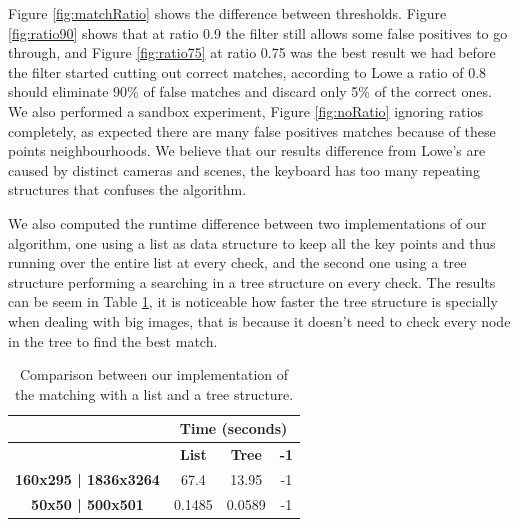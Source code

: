 \documentclass[12pt,a4paper]{article}
\begin{document}
	Figure \ref{fig:matchRatio} shows the difference between thresholds. Figure \ref{fig:ratio90} shows that at ratio 0.9 the filter still allows some false positives to go through, and Figure \ref{fig:ratio75} at ratio 0.75 was the best result we had before the filter started cutting out correct matches, according to Lowe a ratio of 0.8 should eliminate 90\% of false matches and discard only 5\% of the correct ones. We also performed a sandbox experiment, Figure \ref{fig:noRatio} ignoring ratios completely, as expected there are many false positives matches because of these points neighbourhoods. We believe that our results difference from Lowe's are caused by distinct cameras and scenes, the keyboard has too many repeating structures that confuses the algorithm.
\par
	We also computed the runtime difference between two implementations of our algorithm, one using a list as data structure to keep all the key points and thus running over the entire list at every check, and the second one using a tree structure performing a searching in a tree structure on every check. The results can be seem in Table \ref{table:match}, it is noticeable how faster the tree structure is specially when dealing with big images, that is because it doesn't need to check every node in the tree to find the best match.

\begin{table}[!h]
	\centering
	\begin{tabular}{|c|c|c|c|}
		\hline
		& \multicolumn{3}{c|}{\textbf{Time (seconds)}} \\ \hline
		\backslashbox{\textbf{Images Size}}{\textbf{Data Structure}}    & \textbf{List}         & \textbf{Tree}          & \textbf{-1}      \\ \hline
		\textbf{160x295 | 1836x3264}  & 67.4      & 13.95      & -1     \\ \hline
		\textbf{50x50 | 500x501} & 0.1485      & 0.0589       & -1     \\ \hline
	\end{tabular}
	\caption{Comparison between our implementation of the matching with a list and a tree structure.}
	\label{table:match}
\end{table}
\end{document}
